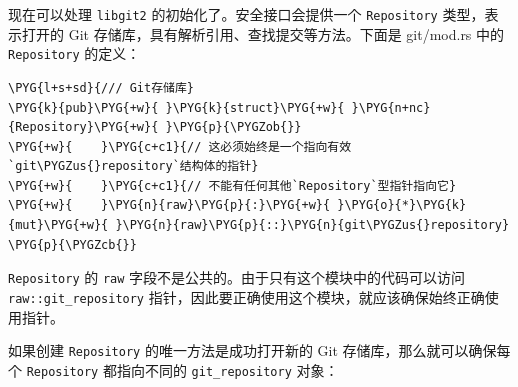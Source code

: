 现在可以处理 \texttt{libgit2} 的初始化了。安全接口会提供一个 \texttt{Repository} 类型，表示打开的 Git 存储库，具有解析引用、查找提交等方法。下面是 git/mod.rs 中的 \texttt{Repository} 的定义：

\begin{Verbatim}[commandchars=\\\{\},breaklines=true,breakanywhere=true,fontsize=\codefont,xleftmargin=17bp]
\PYG{l+s+sd}{/// Git存储库}
\PYG{k}{pub}\PYG{+w}{ }\PYG{k}{struct}\PYG{+w}{ }\PYG{n+nc}{Repository}\PYG{+w}{ }\PYG{p}{\PYGZob{}}
\PYG{+w}{    }\PYG{c+c1}{// 这必须始终是一个指向有效`git\PYGZus{}repository`结构体的指针}
\PYG{+w}{    }\PYG{c+c1}{// 不能有任何其他`Repository`型指针指向它}
\PYG{+w}{    }\PYG{n}{raw}\PYG{p}{:}\PYG{+w}{ }\PYG{o}{*}\PYG{k}{mut}\PYG{+w}{ }\PYG{n}{raw}\PYG{p}{::}\PYG{n}{git\PYGZus{}repository}
\PYG{p}{\PYGZcb{}}
\end{Verbatim}

\texttt{Repository} 的 \texttt{raw} 字段不是公共的。由于只有这个模块中的代码可以访问 \texttt{raw::git\_repository} 指针，因此要正确使用这个模块，就应该确保始终正确使用指针。

如果创建 \texttt{Repository} 的唯一方法是成功打开新的 Git 存储库，那么就可以确保每个 \texttt{Repository} 都指向不同的 \texttt{git\_repository} 对象：

